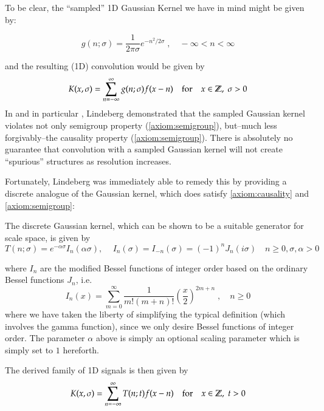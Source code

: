     To be clear, the ``sampled'' 1D Gaussian Kernel we have in mind might be given by:
   
    \begin{defn}
    	\[
    	g(n ; \sigma) = \frac{1}{2\pi \sigma} e^{-n^2 / 2\sigma} \;,\quad -\infty < n < \infty
    	\]
    	\end{defn}
    and the  resulting (1D) convolution would be given by
    \[
	    K(x,\sigma) = \sum_{n=-\infty}^{\infty} g(n;\sigma) f(x-n)
	    \quad \textrm{for} \quad x \in \mathbb{Z}, \; \sigma > 0
    \]
    In \cite{lindeberg-discrete} and in particular \cite{lindeberg1988-discreteconstruction}, Lindeberg demonstrated that the sampled Gaussian kernel violates not only semigroup property (\cref{axiom:semigroup}), but--much less forgivably--the causality property (\cref{axiom:semigroup}). There is absolutely no guarantee that convolution with a sampled Gaussian kernel will not create ``spurious'' structures as resolution increases.
    
    
    Fortunately, Lindeberg was immediately able to remedy this by providing a discrete analogue of the Gaussian kernel, which does satisfy \cref{axiom:causality} and \cref{axiom:semigroup}:
    
    \begin{defn}
    	The discrete Gaussian kernel, which can be shown to be a suitable generator
    	for scale space, is given by
    	\begin{equation}
    	T(n;\sigma) = e^{-\alpha \sigma} I_n(\alpha \sigma) ,\quad\,
    	 I_n(\sigma) = I_{-n}(\sigma) = (-1)^n J_n(i\sigma) 
    	 \quad n \ge 0 , \sigma,\alpha > 0
    	 \end{equation}
    \end{defn}
    where $I_n$ are the modified Bessel functions of integer order based on the
    ordinary Bessel functions $J_n$, i.e.
    \[
    I_n(x) = \sum_{m=0}^{\infty} \frac{1}{m! (m+n)!}
	    	\left(\frac{x}{2}\right)^{2m+n} \;,\quad n \ge 0
    \]
    where we have taken the liberty of simplifying the typical definition \cite{abramowitz-stegun} (which involves the gamma function), since we only desire
    Bessel functions of integer order. The parameter $\alpha$ above is simply an
    optional scaling parameter which is simply set to $1$ hereforth.
    
    The derived family of 1D signals is then given by
\begin{equation} \label{eq:derived-family-from-discrete}
        K(x,\sigma) = \sum_{n=-\infty}^{\infty} T(n;t) f(x-n)
        \quad \textrm{for} \quad x \in \mathbb{Z}, \; t > 0
        \end{equation}
    
